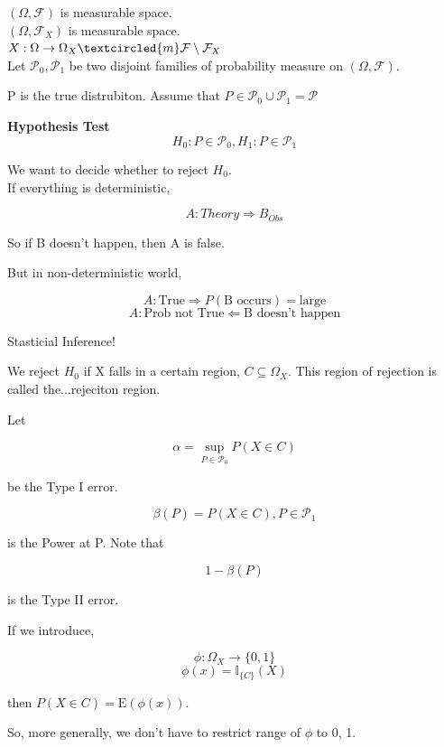 \documentclass[11pt,fleqn]{book} %
\newcommand{\E}{\mathrm{E}}
\begin{document}
$(\Omega, \mathcal{F})$ is measurable space. \\
$(\Omega, \mathcal{F}_X)$ is measurable space. \\
$X: \Omega \rightarrow \Omega_X \textcircled{m} \mathcal{F} \setminus \mathcal{F}_X$\\


Let $\mathcal{P}_0, \mathcal{P}_1$ be two disjoint families of probability measure on $(\Omega, \mathcal{F})$. 

P is the true distrubiton. Assume that $P \in \mathcal{P}_0 \cup \mathcal{P}_1 = \mathcal{P}$

\textbf{Hypothesis Test}\\

		$$H_0: P \in \mathcal{P}_0, H_1: P \in \mathcal{P}_1 $$

We want to decide whether to reject $H_0$. \\


If everything is deterministic, 

		$$A:Theory \Rightarrow B_{Obs} $$

So if B doesn't happen, then A is false. 

But in non-deterministic world, 

		$$A:\text{True} \Rightarrow P(\text{B occurs}) = \text{large} $$
		$$A:\text{Prob not True} \Leftarrow \text{B doesn't happen} $$

Stasticial Inference!

We reject $H_0$ if X falls in a certain region, $C \subseteq \Omega_X$. This region of rejection is called the...rejeciton region. 

\begin{definition}
	Let 

			$$ \alpha = \sup_{P \in \mathcal{P}_0} P(X \in C) $$

	be the Type I error. 

			$$\beta(P) = P(X \in C), P \in \mathcal{P}_1 $$

	is the Power at P. Note that

			$$1 - \beta(P) $$

	is the Type II error.
\end{definition}


If we introduce, 

		$$\phi: \Omega_X \rightarrow \{0,1\} $$
		$$ \phi(x) = \mathbb{I}_{\{C\}}(X) $$

then $P(X \in C) = \E (\phi(x))$. 

So, more generally, we don't have to restrict range of $\phi$ to {0, 1}. 
\end{document}
